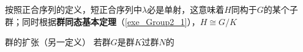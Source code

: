 按照正合序列的定义，短正合序列中$\lambda$必是单射，这意味着$H$同构于$G$的某个子群；同时根据\textbf{群同态基本定理}（\autoref{exe_Group2_1}），$H\cong G/K$




\begin{theorem}{群的扩张（另一定义）}
若群$G$是群$K$过群$N$的
\end{theorem}




































